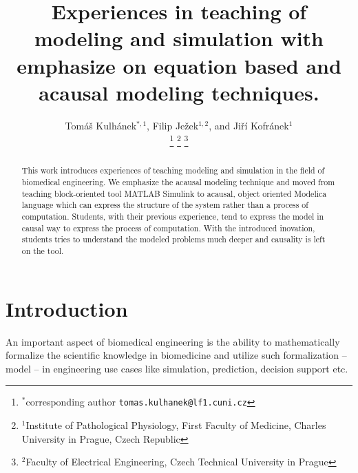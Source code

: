 \documentclass[letterpaper, 10 pt, conference]{ieeeconf}  %
\title{\LARGE \bf
Experiences in teaching of modeling and simulation with emphasize on equation based and acausal modeling techniques.
}
\author{\parbox{3 in}{
Tomáš Kulhánek$^{*,1}$, 
Filip Ježek$^{1,2}$, 
and Jiří Kofránek$^{1}$}%
\thanks{$^{*}$corresponding author {\tt\small tomas.kulhanek@lf1.cuni.cz}}%
\thanks{$^{1}$Institute of Pathological Physiology, First Faculty of Medicine, Charles University in Prague, Czech Republic}%
\thanks{$^{2}$Faculty of Electrical Engineering, Czech Technical University in Prague}%
}
\begin{document}
\maketitle
\thispagestyle{empty}
\pagestyle{empty}


\begin{abstract}

This work introduces experiences of teaching modeling and simulation in the field of biomedical engineering. We emphasize the acausal modeling technique and moved from teaching block-oriented tool MATLAB Simulink to acausal, object oriented Modelica language which can express the structure of the system rather than a process of computation. 
Students, with their previous experience, tend to express the model in causal way to express the process of computation. With the introduced inovation, students tries to understand the modeled problems much deeper and causality is left on the tool.  

\end{abstract}


\section{Introduction}
An important aspect of biomedical engineering is the ability to mathematically formalize the scientific knowledge in biomedicine and utilize such formalization -- model -- in engineering use cases like simulation, prediction, decision support etc. 
\end{document}

